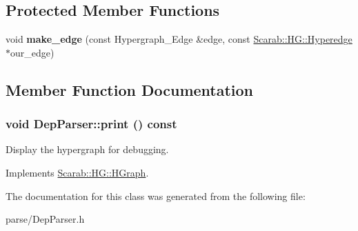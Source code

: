 \subsection*{Protected Member Functions}
\begin{DoxyCompactItemize}
\item 
\hypertarget{classDepParser_a04d313d931d1e8b0bac3a36ca7be469b}{
void {\bfseries make\_\-edge} (const Hypergraph\_\-Edge \&edge, const \hyperlink{classScarab_1_1HG_1_1Hyperedge}{Scarab::HG::Hyperedge} $\ast$our\_\-edge)}
\label{classDepParser_a04d313d931d1e8b0bac3a36ca7be469b}

\end{DoxyCompactItemize}


\subsection{Member Function Documentation}
\hypertarget{classDepParser_a9aebbbde821bad423b6c01cc12f02a2c}{
\subsubsection[{print}]{\setlength{\rightskip}{0pt plus 5cm}void DepParser::print () const}}
\label{classDepParser_a9aebbbde821bad423b6c01cc12f02a2c}
Display the hypergraph for debugging. 

Implements \hyperlink{classScarab_1_1HG_1_1HGraph_ab5aa11c932b28864b56f28e0babbc1c1}{Scarab::HG::HGraph}.



The documentation for this class was generated from the following file:\begin{DoxyCompactItemize}
\item 
parse/DepParser.h\end{DoxyCompactItemize}

